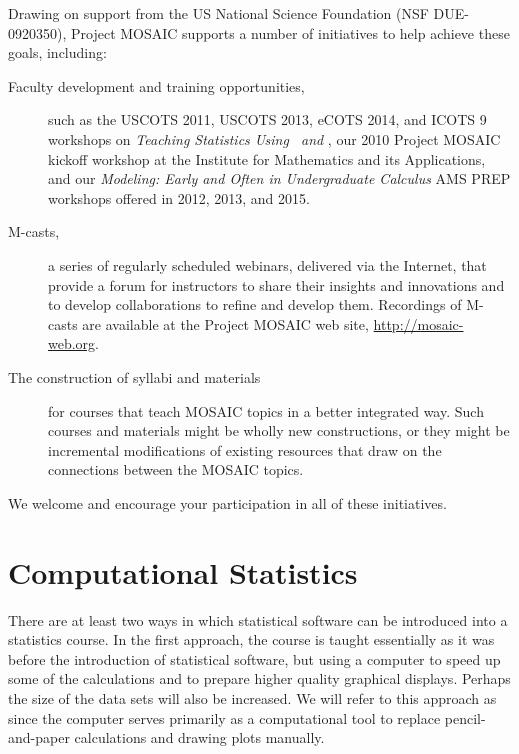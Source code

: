 \documentclass{tufte-book}\usepackage[]{graphicx}\usepackage[]{xcolor}
\begin{document}
Drawing on support from the US National Science Foundation (NSF DUE-0920350),
Project MOSAIC supports a number of initiatives to help achieve these goals,
including:
\begin{description}
\item
[Faculty development and training opportunities,] 
such as the USCOTS 2011, USCOTS 2013, eCOTS 2014, and ICOTS 9 workshops on 
\emph{Teaching Statistics Using \R\ and \RStudio}, our 2010 
Project MOSAIC kickoff workshop at the Institute for Mathematics
and its Applications, and our \emph{Modeling: Early and Often in Undergraduate Calculus}
AMS PREP workshops offered in 2012,  2013, and 2015.

\item
[M-casts,] 
a series of regularly scheduled webinars, delivered via the Internet, 
that provide a forum for instructors to share their insights and innovations 
and to develop collaborations to refine and develop them.
Recordings of M-casts are available
at the Project MOSAIC web site, \url{http://mosaic-web.org}.


\item[The construction of syllabi and materials] 
for courses that teach MOSAIC topics in a better integrated way. Such
courses and materials might be wholly new constructions, or they might be 
incremental modifications of existing resources that draw on the 
connections between the MOSAIC topics.
\end{description}

We welcome and encourage your participation in all of these initiatives.

\chapter*{Computational Statistics}

There are at least two ways in which statistical software
can be introduced into a statistics course.  In the first approach, the course
is taught essentially as it was before the introduction of statistical 
software, but using a computer to speed up some of the calculations and 
to prepare higher quality graphical displays.  Perhaps the size of the 
data sets will also be increased.   We will refer to this approach as 
since the computer serves primarily as a computational
tool to replace pencil-and-paper calculations and drawing plots manually.
\end{document}
